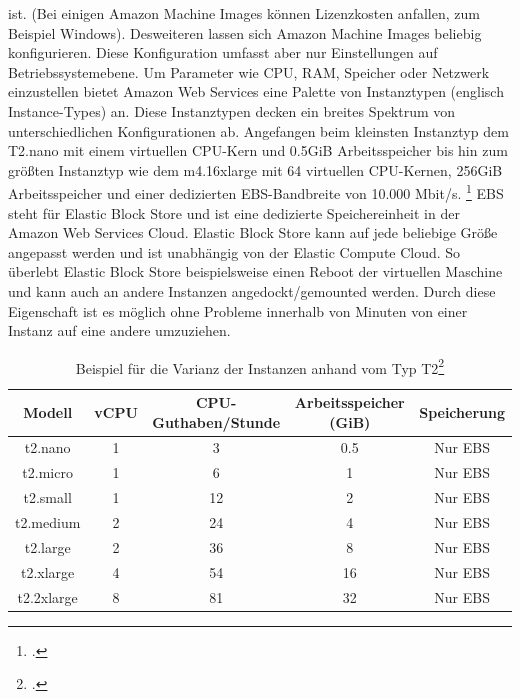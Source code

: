 \documentclass[titlepage]{report}
\begin{document}
ist. (Bei einigen Amazon Machine Images können Lizenzkosten anfallen,
zum Beispiel Windows). Desweiteren lassen sich Amazon Machine Images
beliebig konfigurieren. Diese Konfiguration umfasst aber nur
Einstellungen auf Betriebssystemebene. Um Parameter wie CPU, RAM,
Speicher oder Netzwerk einzustellen bietet Amazon Web Services eine
Palette von Instanztypen (englisch Instance\hyp{}Types) an.  Diese
Instanztypen decken ein breites Spektrum von unterschiedlichen
Konfigurationen ab. Angefangen beim kleinsten Instanztyp dem T2.nano mit
einem virtuellen CPU\hyp{}Kern und 0.5GiB Arbeitsspeicher bis hin zum
größten Instanztyp wie dem m4.16xlarge mit 64 virtuellen
CPU\hyp{}Kernen, 256GiB Arbeitsspeicher und einer dedizierten
EBS\hyp{}Bandbreite von 10.000 Mbit/s.  \footcite{instance} EBS steht
für Elastic Block Store und ist eine dedizierte Speichereinheit in der
Amazon Web Services Cloud. Elastic Block Store kann auf jede beliebige
Größe angepasst werden und ist unabhängig von der Elastic Compute Cloud.
So überlebt Elastic Block Store beispielsweise einen Reboot der
virtuellen Maschine und kann auch an andere Instanzen
angedockt/gemounted werden. Durch diese Eigenschaft ist es möglich ohne
Probleme innerhalb von Minuten von einer Instanz auf eine andere
umzuziehen.
\begin{table}[h]
    \centering
    \caption{Beispiel für die Varianz der Instanzen anhand vom Typ T2\footcite{instance}}
    \label{tab:1}
\begin{tabular}{|c|c|c|c|c|}
\hline
Modell     & vCPU & CPU\hyp{}Guthaben/Stunde & Arbeitsspeicher (GiB) & Speicherung \\ \hline
t2.nano    & 1    & 3                   & 0.5                   & Nur EBS     \\
t2.micro   & 1    & 6                   & 1                     & Nur EBS     \\
t2.small   & 1    & 12                  & 2                     & Nur EBS     \\
t2.medium  & 2    & 24                  & 4                     & Nur EBS     \\
t2.large   & 2    & 36                  & 8                     & Nur EBS     \\
t2.xlarge  & 4    & 54                  & 16                    & Nur EBS     \\
t2.2xlarge & 8    & 81                  & 32                    & Nur EBS     \\ \hline
\end{tabular}
\end{table}
\end{document}

